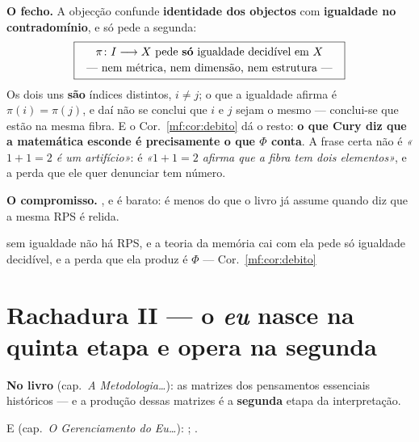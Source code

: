 \documentclass[../livro.tex]{subfiles}
\begin{document}
\medskip\noindent\textbf{O fecho.} A objecção confunde \textbf{identidade dos
objectos} com \textbf{igualdade no contradomínio}, e  só pede a segunda:
\[
\boxed{\;\begin{array}{c}
\pi\colon I\longrightarrow X\ \text{pede \textbf{só} igualdade decidível em }X\\[2pt]
\text{--- nem métrica, nem dimensão, nem estrutura ---}
\end{array}\;}
\]
Os dois uns \textbf{são} índices distintos, $i\neq j$; o que a igualdade afirma é
$\pi(i)=\pi(j)$, e daí não se conclui que $i$ e $j$ sejam o mesmo --- conclui-se
que estão na mesma fibra. E o Cor.~\ref{mf:cor:debito} dá o resto: \textbf{o que
Cury diz que a matemática esconde é precisamente o que $\Phi$ conta}. A frase
certa não é \emph{«$1+1=2$ é um artifício»}: é \emph{«$1+1=2$ afirma que a fibra
tem dois elementos»}, e a perda que ele quer denunciar tem número.

\medskip\noindent\textbf{O compromisso.} , e é barato: é menos do que o
livro já assume quando diz que a mesma RPS é relida.

      {sem igualdade não há RPS, e a teoria da memória cai com ela}
      { pede só igualdade decidível, e a perda que ela produz é
       $\Phi$ --- Cor.~\ref{mf:cor:debito}}

\section{Rachadura II --- o \emph{eu} nasce na quinta etapa e opera na segunda}\label{mf:r2}

\noindent\textbf{No livro} (cap.~\emph{A Metodologia\dots}): as matrizes dos
pensamentos essenciais históricos  --- e a produção dessas matrizes é a \textbf{segunda} etapa da
interpretação.

\noindent E (cap.~\emph{O Gerenciamento do Eu\dots}): ; .
\end{document}

